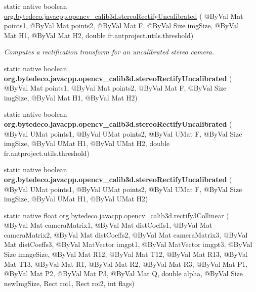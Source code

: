 \begin{DoxyCompactItemize}
\item 
static native boolean \hyperlink{group__calib3d_ga2a00c796082466a7d1000418118e02d2}{org.\+bytedeco.\+javacpp.\+opencv\+\_\+calib3d.\+stereo\+Rectify\+Uncalibrated} ( @By\+Val Mat points1, @By\+Val Mat points2, @By\+Val Mat F, @By\+Val Size img\+Size, @By\+Val Mat H1, @By\+Val Mat H2, double fr.antproject.utils.threshold)
\begin{DoxyCompactList}\small\item\em Computes a rectification transform for an uncalibrated stereo camera. \end{DoxyCompactList}\item 
\mbox{\label{group__calib3d_gae51ed9a742371e9fd093f4b5ee1e27d9}} 
static native boolean {\bfseries org.\+bytedeco.\+javacpp.\+opencv\+\_\+calib3d.\+stereo\+Rectify\+Uncalibrated} ( @By\+Val Mat points1, @By\+Val Mat points2, @By\+Val Mat F, @By\+Val Size img\+Size, @By\+Val Mat H1, @By\+Val Mat H2)
\item 
\mbox{\label{group__calib3d_gae5c58169fa1d21ee393876af9b8a9b0e}} 
static native boolean {\bfseries org.\+bytedeco.\+javacpp.\+opencv\+\_\+calib3d.\+stereo\+Rectify\+Uncalibrated} ( @By\+Val U\+Mat points1, @By\+Val U\+Mat points2, @By\+Val U\+Mat F, @By\+Val Size img\+Size, @By\+Val U\+Mat H1, @By\+Val U\+Mat H2, double fr.antproject.utils.threshold)
\item 
\mbox{\label{group__calib3d_ga60d699e8feea67069a80042af331688f}} 
static native boolean {\bfseries org.\+bytedeco.\+javacpp.\+opencv\+\_\+calib3d.\+stereo\+Rectify\+Uncalibrated} ( @By\+Val U\+Mat points1, @By\+Val U\+Mat points2, @By\+Val U\+Mat F, @By\+Val Size img\+Size, @By\+Val U\+Mat H1, @By\+Val U\+Mat H2)
\item 
static native float \hyperlink{group__calib3d_ga44e3e2ed99710a5b0679459a2988bbd9}{org.\+bytedeco.\+javacpp.\+opencv\+\_\+calib3d.\+rectify3\+Collinear} ( @By\+Val Mat camera\+Matrix1, @By\+Val Mat dist\+Coeffs1, @By\+Val Mat camera\+Matrix2, @By\+Val Mat dist\+Coeffs2, @By\+Val Mat camera\+Matrix3, @By\+Val Mat dist\+Coeffs3, @By\+Val Mat\+Vector imgpt1, @By\+Val Mat\+Vector imgpt3, @By\+Val Size image\+Size, @By\+Val Mat R12, @By\+Val Mat T12, @By\+Val Mat R13, @By\+Val Mat T13, @By\+Val Mat R1, @By\+Val Mat R2, @By\+Val Mat R3, @By\+Val Mat P1, @By\+Val Mat P2, @By\+Val Mat P3, @By\+Val Mat Q, double alpha, @By\+Val Size new\+Img\+Size, Rect roi1, Rect roi2, int flags)

\end{DoxyCompactItemize}
